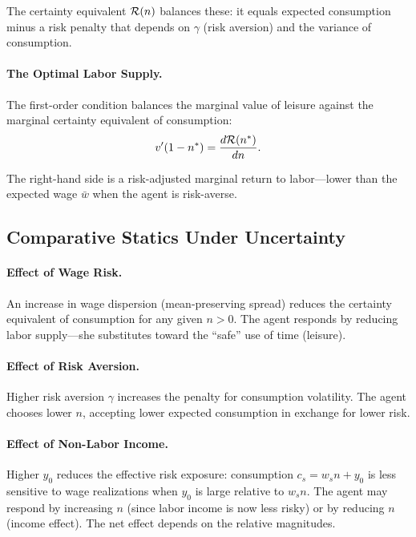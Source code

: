 The certainty equivalent $\mathcal{R}(n)$ balances these: it equals expected consumption minus a risk penalty that depends on $\gamma$ (risk aversion) and the variance of consumption.

\paragraph{The Optimal Labor Supply.}
The first-order condition balances the marginal value of leisure against the marginal certainty equivalent of consumption:
\begin{equation}
v'(1 - n^*) = \frac{d \mathcal{R}(n^*)}{dn}.
\label{eq:foc-uncertainty}
\end{equation}

The right-hand side is a risk-adjusted marginal return to labor---lower than the expected wage $\bar{w}$ when the agent is risk-averse.

\subsection{Comparative Statics Under Uncertainty}
\label{subsec:comparative-uncertainty}

\paragraph{Effect of Wage Risk.}
An increase in wage dispersion (mean-preserving spread) reduces the certainty equivalent of consumption for any given $n > 0$. The agent responds by reducing labor supply---she substitutes toward the ``safe'' use of time (leisure).

\paragraph{Effect of Risk Aversion.}
Higher risk aversion $\gamma$ increases the penalty for consumption volatility. The agent chooses lower $n$, accepting lower expected consumption in exchange for lower risk.

\paragraph{Effect of Non-Labor Income.}
Higher $y_0$ reduces the effective risk exposure: consumption $c_s = w_s n + y_0$ is less sensitive to wage realizations when $y_0$ is large relative to $w_s n$. The agent may respond by increasing $n$ (since labor income is now less risky) or by reducing $n$ (income effect). The net effect depends on the relative magnitudes.

